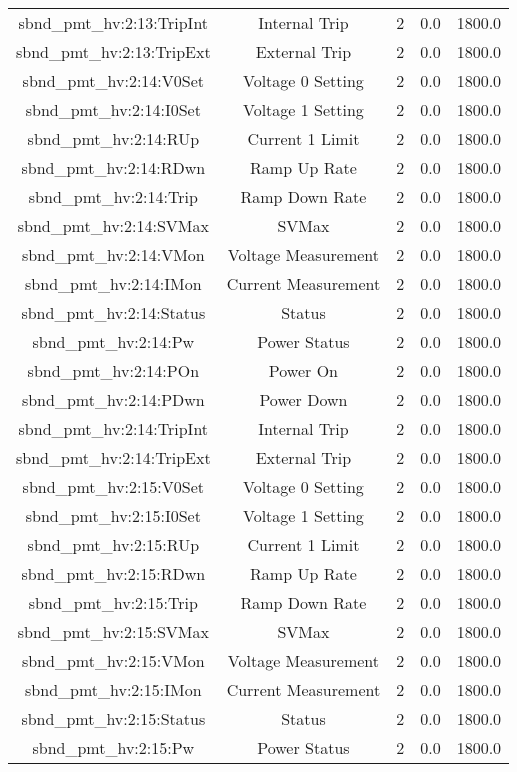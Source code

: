 \begin{center}
\begin{longtable}{c | c c c c }
sbnd\_pmt\_hv:2:13:TripInt & Internal Trip & 2 & 0.0 & 1800.0\\ 
sbnd\_pmt\_hv:2:13:TripExt & External Trip & 2 & 0.0 & 1800.0\\ 
sbnd\_pmt\_hv:2:14:V0Set & Voltage 0 Setting & 2 & 0.0 & 1800.0\\ 
sbnd\_pmt\_hv:2:14:I0Set & Voltage 1 Setting & 2 & 0.0 & 1800.0\\ 
sbnd\_pmt\_hv:2:14:RUp & Current 1 Limit & 2 & 0.0 & 1800.0\\ 
sbnd\_pmt\_hv:2:14:RDwn & Ramp Up Rate & 2 & 0.0 & 1800.0\\ 
sbnd\_pmt\_hv:2:14:Trip & Ramp Down Rate & 2 & 0.0 & 1800.0\\ 
sbnd\_pmt\_hv:2:14:SVMax & SVMax & 2 & 0.0 & 1800.0\\ 
sbnd\_pmt\_hv:2:14:VMon & Voltage Measurement & 2 & 0.0 & 1800.0\\ 
sbnd\_pmt\_hv:2:14:IMon & Current Measurement & 2 & 0.0 & 1800.0\\ 
sbnd\_pmt\_hv:2:14:Status & Status & 2 & 0.0 & 1800.0\\ 
sbnd\_pmt\_hv:2:14:Pw & Power Status & 2 & 0.0 & 1800.0\\ 
sbnd\_pmt\_hv:2:14:POn & Power On & 2 & 0.0 & 1800.0\\ 
sbnd\_pmt\_hv:2:14:PDwn & Power Down & 2 & 0.0 & 1800.0\\ 
sbnd\_pmt\_hv:2:14:TripInt & Internal Trip & 2 & 0.0 & 1800.0\\ 
sbnd\_pmt\_hv:2:14:TripExt & External Trip & 2 & 0.0 & 1800.0\\ 
sbnd\_pmt\_hv:2:15:V0Set & Voltage 0 Setting & 2 & 0.0 & 1800.0\\ 
sbnd\_pmt\_hv:2:15:I0Set & Voltage 1 Setting & 2 & 0.0 & 1800.0\\ 
sbnd\_pmt\_hv:2:15:RUp & Current 1 Limit & 2 & 0.0 & 1800.0\\ 
sbnd\_pmt\_hv:2:15:RDwn & Ramp Up Rate & 2 & 0.0 & 1800.0\\ 
sbnd\_pmt\_hv:2:15:Trip & Ramp Down Rate & 2 & 0.0 & 1800.0\\ 
sbnd\_pmt\_hv:2:15:SVMax & SVMax & 2 & 0.0 & 1800.0\\ 
sbnd\_pmt\_hv:2:15:VMon & Voltage Measurement & 2 & 0.0 & 1800.0\\ 
sbnd\_pmt\_hv:2:15:IMon & Current Measurement & 2 & 0.0 & 1800.0\\ 
sbnd\_pmt\_hv:2:15:Status & Status & 2 & 0.0 & 1800.0\\ 
sbnd\_pmt\_hv:2:15:Pw & Power Status & 2 & 0.0 & 1800.0\\ 

\end{longtable}
\end{center}
